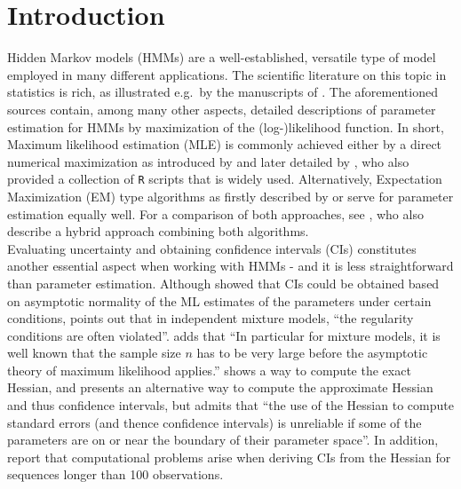 \documentclass[bimj,fleqn]{w-art}\usepackage[]{graphicx}\usepackage[]{color}
\theoremstyle{plain}
\theoremstyle{definition}
\begin{document}
\maketitle

\newpage


\section{Introduction}
\label{sec:intro}

Hidden Markov models (HMMs) are a well-established, versatile type of model employed in many different applications. The scientific literature on this topic in statistics is rich, as illustrated e.g.~by the manuscripts of \cite{zucchini, cappe, bartolucci}. The aforementioned sources contain, among many other aspects, detailed descriptions of parameter estimation for HMMs by maximization of the (log-)likelihood function. In short, Maximum likelihood estimation (MLE) is commonly achieved either by a direct numerical maximization as introduced by \citet{turner} and later detailed by \citet{zucchini}, who also provided a collection of {\tt{R}} \citep{rcoreteam} scripts that is widely used. Alternatively, Expectation Maximization (EM) type algorithms as firstly described by \citet{bauma} or \citet{dempster} serve for parameter estimation equally well. For a comparison of both approaches, see \citet{bulla}, who also describe a hybrid approach combining both algorithms.\\
Evaluating uncertainty and obtaining confidence intervals (CIs) constitutes another essential aspect when working with HMMs - and it is less straightforward than parameter estimation. Although \citet[][Ch.~12]{cappe} showed that CIs could be obtained based on asymptotic normality of the ML estimates of the parameters under certain conditions, \citet[p. ~53]{fruhwirth-schnatter} points out that in independent mixture models, ``the regularity conditions are often violated''. \citet[p.~68]{mclachlan} adds that ``In particular for mixture models, it is well known that the sample size $n$ has to be very large before the asymptotic theory of maximum likelihood applies.'' \citet{lystig} shows a way to compute the exact Hessian, and \citet{zucchini} presents an alternative way to compute the approximate Hessian and thus confidence intervals, but admits that ``the use of the Hessian to compute standard errors (and thence confidence intervals) is unreliable if some of the parameters are on or near the boundary of their parameter space''. In addition, \citet{visser} report that computational problems arise when deriving CIs from the Hessian for sequences longer than 100 observations.\\  
\end{document}
